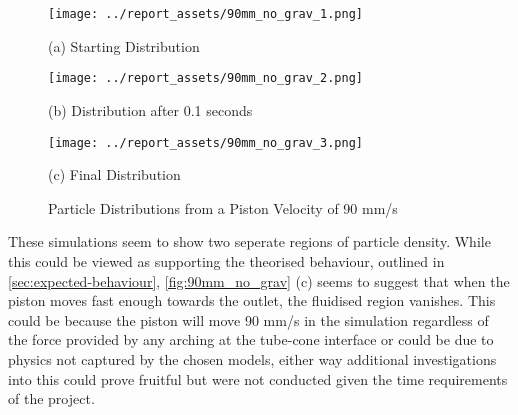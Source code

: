 \begin{figure}[htbp]
    \centering

    \begin{minipage}{0.32\textwidth}
        \centering
        \texttt{[image: ../report\_assets/90mm\_no\_grav\_1.png]}
        \caption*{(a) Starting Distribution}
    \end{minipage}
    \hfill
    \begin{minipage}{0.32\textwidth}
        \centering
        \texttt{[image: ../report\_assets/90mm\_no\_grav\_2.png]}
        \caption*{(b) Distribution after 0.1 seconds}
    \end{minipage}
    \hfill
    \begin{minipage}{0.32\textwidth}
        \centering
        \texttt{[image: ../report\_assets/90mm\_no\_grav\_3.png]}
        \caption*{(c) Final Distribution}
    \end{minipage}
    \caption{Particle Distributions from a Piston Velocity of 90 mm/s}

\end{figure}\label{fig:90mm_no_grav}
These simulations seem to show two seperate regions of particle density. While this could be viewed as supporting the theorised behaviour, outlined in \autoref{sec:expected-behaviour}, \autoref{fig:90mm_no_grav} (c) seems to suggest that when the piston moves fast enough towards the outlet, the fluidised region vanishes. This could be because the piston will move 90 mm/s in the simulation regardless of the force provided by any arching at the tube-cone interface or could be due to physics not captured by the chosen models, either way additional investigations into this could prove fruitful but were not conducted given the time requirements of the project.

